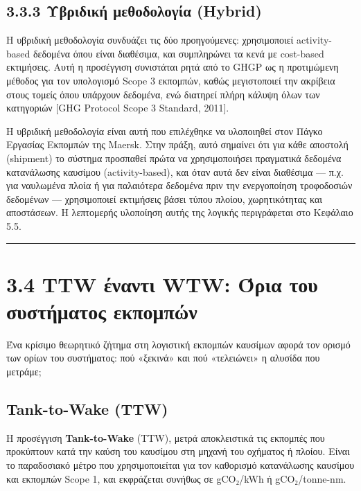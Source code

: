 \subsection{3.3.3 Υβριδική μεθοδολογία
(Hybrid)}\label{ux3c5ux3b2ux3c1ux3b9ux3b4ux3b9ux3baux3ae-ux3bcux3b5ux3b8ux3bfux3b4ux3bfux3bbux3bfux3b3ux3afux3b1-hybrid}

Η υβριδική μεθοδολογία συνδυάζει τις δύο προηγούμενες: χρησιμοποιεί
activity-based δεδομένα όπου είναι διαθέσιμα, και συμπληρώνει τα κενά με
cost-based εκτιμήσεις. Αυτή η προσέγγιση συνιστάται ρητά από το GHGP ως
η προτιμώμενη μέθοδος για τον υπολογισμό Scope 3 εκπομπών, καθώς
μεγιστοποιεί την ακρίβεια στους τομείς όπου υπάρχουν δεδομένα, ενώ
διατηρεί πλήρη κάλυψη όλων των κατηγοριών {[}GHG Protocol Scope 3
Standard, 2011{]}.

Η υβριδική μεθοδολογία είναι αυτή που επιλέχθηκε να υλοποιηθεί στον
Πάγκο Εργασίας Εκπομπών της Maersk. Στην πράξη, αυτό σημαίνει ότι για
κάθε αποστολή (shipment) το σύστημα προσπαθεί πρώτα να χρησιμοποιήσει
πραγματικά δεδομένα κατανάλωσης καυσίμου (activity-based), και όταν αυτά
δεν είναι διαθέσιμα --- π.χ. για ναυλωμένα πλοία ή για παλαιότερα
δεδομένα πριν την ενεργοποίηση τροφοδοσιών δεδομένων --- χρησιμοποιεί
εκτιμήσεις βάσει τύπου πλοίου, χωρητικότητας και αποστάσεων. Η
λεπτομερής υλοποίηση αυτής της λογικής περιγράφεται στο Κεφάλαιο 5.5.

\begin{center}\rule{0.5\linewidth}{0.5pt}\end{center}

\section{3.4 TTW έναντι WTW: Όρια του συστήματος
εκπομπών}\label{ttw-ux3adux3bdux3b1ux3bdux3c4ux3b9-wtw-ux3ccux3c1ux3b9ux3b1-ux3c4ux3bfux3c5-ux3c3ux3c5ux3c3ux3c4ux3aeux3bcux3b1ux3c4ux3bfux3c2-ux3b5ux3baux3c0ux3bfux3bcux3c0ux3ceux3bd}

Ένα κρίσιμο θεωρητικό ζήτημα στη λογιστική εκπομπών καυσίμων αφορά τον
ορισμό των ορίων του συστήματος: πού «ξεκινά» και πού «τελειώνει» η
αλυσίδα που μετράμε;

\subsection{Tank-to-Wake (TTW)}\label{tank-to-wake-ttw}

Η προσέγγιση \textbf{Tank-to-Wake} (TTW), μετρά αποκλειστικά τις
εκπομπές που προκύπτουν κατά την καύση του καυσίμου στη μηχανή του
οχήματος ή πλοίου. Είναι το παραδοσιακό μέτρο που χρησιμοποιείται για
τον καθορισμό κατανάλωσης καυσίμου και εκπομπών Scope 1, και εκφράζεται
συνήθως σε gCO₂/kWh ή gCO₂/tonne-nm.

